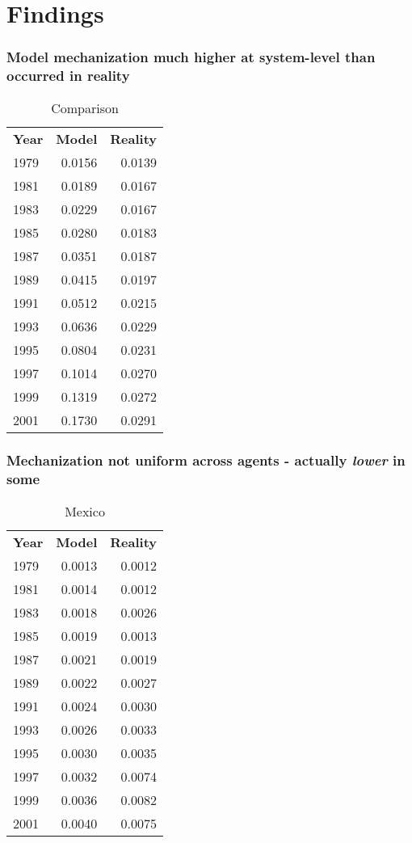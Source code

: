 \documentclass{beamer}
\begin{document}
\section{Findings}

\begin{frame}
	\frametitle{Model mechanization much higher at system-level than
	occurred in reality}
\begin{table}[h]
	\centering
	\caption{Comparison}
	\begin{tabular}{|l r r|}
		\hline
		\textbf{Year} & \textbf{Model} & \textbf{Reality} \\
		1979 & 0.0156 & 0.0139 \\
		1981 & 0.0189 & 0.0167 \\
		1983 & 0.0229 & 0.0167 \\
		1985 & 0.0280 & 0.0183 \\
		1987 & 0.0351 & 0.0187 \\
		1989 & 0.0415 & 0.0197 \\
		1991 & 0.0512 & 0.0215 \\
		1993 & 0.0636 & 0.0229 \\
		1995 & 0.0804 & 0.0231 \\
		1997 & 0.1014 & 0.0270 \\
		1999 & 0.1319 & 0.0272 \\
		2001 & 0.1730 & 0.0291 \\
		\hline
	\end{tabular}
\end{table}
\end{frame}

\begin{frame}
	\frametitle{Mechanization not uniform across agents - actually
	\textit{lower} in some}
	\begin{table}[h]
		\centering
		\caption{Mexico}
		\begin{tabular}{|l r r|}
			\hline
			\textbf{Year} & \textbf{Model} & \textbf{Reality} \\
			1979 & 0.0013 & 0.0012 \\
			1981 & 0.0014 & 0.0012 \\
			1983 & 0.0018 & 0.0026 \\
			1985 & 0.0019 & 0.0013 \\
			1987 & 0.0021 & 0.0019 \\
			1989 & 0.0022 & 0.0027 \\
			1991 & 0.0024 & 0.0030 \\
			1993 & 0.0026 & 0.0033 \\
			1995 & 0.0030 & 0.0035 \\
			1997 & 0.0032 & 0.0074 \\
			1999 & 0.0036 & 0.0082 \\
			2001 & 0.0040 & 0.0075 \\
			\hline
		\end{tabular}
	\end{table}
\end{frame}
\end{document}
